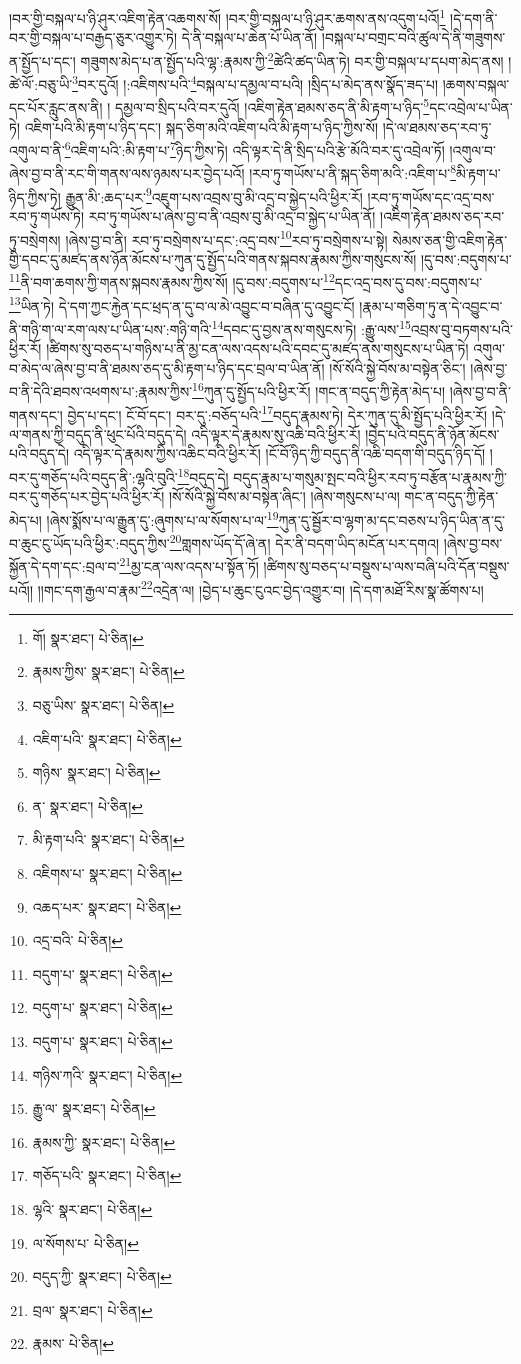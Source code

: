 །བར་གྱི་བསྐལ་པ་ཉི་ཤུར་འཇིག་རྟེན་འཆགས་སོ། །བར་གྱི་བསྐལ་པ་ཉི་ཤུར་ཆགས་ནས་འདུག་པའོ།\footnote{གོ།  སྣར་ཐང་།  པེ་ཅིན། } །དེ་དག་ནི་བར་གྱི་བསྐལ་པ་བརྒྱད་ཅུར་འགྱུར་ཏེ། དེ་ནི་བསྐལ་པ་ཆེན་པོ་ཡིན་ནོ། །བསྐལ་པ་བགྲང་བའི་ཚུལ་དེ་ནི་གཟུགས་ན་སྤྱོད་པ་དང་། གཟུགས་མེད་པ་ན་སྤྱོད་པའི་ལྷ་:རྣམས་ཀྱི་\footnote{རྣམས་ཀྱིས་  སྣར་ཐང་།  པེ་ཅིན། }ཚེའི་ཚད་ཡིན་ཏེ། བར་གྱི་བསྐལ་པ་དཔག་མེད་ནས། །ཚེ་ལོ་:བཅུ་ཡི་\footnote{བཅུ་ཡིས་  སྣར་ཐང་།  པེ་ཅིན། }བར་དུའོ། །:འཇིགས་པའི་\footnote{འཇིག་པའི་  སྣར་ཐང་།  པེ་ཅིན། }བསྐལ་པ་དམྱལ་བ་པའི། །སྲིད་པ་མེད་ནས་སྣོད་ཟད་པ། །ཆགས་བསྐལ་དང་པོར་རླུང་ནས་ནི། །
དམྱལ་བ་སྲིད་པའི་བར་དུའོ། །འཇིག་རྟེན་ཐམས་ཅད་ནི་མི་རྟག་པ་ཉིད་\footnote{གཉིས་  སྣར་ཐང་།  པེ་ཅིན། }དང་འབྲེལ་པ་ཡིན་ཏེ། འཇིག་པའི་མི་རྟག་པ་ཉིད་དང་། སྐད་ཅིག་མའི་འཇིག་པའི་མི་རྟག་པ་ཉིད་ཀྱིས་སོ། །དེ་ལ་ཐམས་ཅད་རབ་ཏུ་འགུལ་བ་ནི་\footnote{ན་  སྣར་ཐང་།  པེ་ཅིན། }འཇིག་པའི་:མི་རྟག་པ་\footnote{མི་རྟག་པའི་  སྣར་ཐང་།  པེ་ཅིན། }ཉིད་ཀྱིས་ཏེ། འདི་ལྟར་དེ་ནི་སྲིད་པའི་རྩེ་མོའི་བར་དུ་འབྲེལ་ཏོ། །འགུལ་བ་ཞེས་བྱ་བ་ནི་རང་གི་གནས་ལས་ཉམས་པར་བྱེད་པའོ། །རབ་ཏུ་གཡོས་པ་ནི་སྐད་ཅིག་མའི་:འཇིག་པ་\footnote{འཇིགས་པ་  སྣར་ཐང་།  པེ་ཅིན། }མི་རྟག་པ་ཉིད་ཀྱིས་ཏེ། རྒྱུན་མི་:ཆད་པར་\footnote{འཆད་པར་  སྣར་ཐང་།  པེ་ཅིན། }འཇུག་པས་འབྲས་བུ་མི་འདྲ་བ་སྐྱེད་པའི་ཕྱིར་རོ། །རབ་ཏུ་གཡོས་དང་འདྲ་བས་རབ་ཏུ་གཡོས་ཏེ། རབ་ཏུ་གཡོས་པ་ཞེས་བྱ་བ་ནི་འབྲས་བུ་མི་འདྲ་བ་སྐྱེད་པ་ཡིན་ནོ། །འཇིག་རྟེན་ཐམས་ཅད་རབ་ཏུ་བསྲེགས། །ཞེས་བྱ་བ་ནི། རབ་ཏུ་བསྲེགས་པ་དང་:འདྲ་བས་\footnote{འདྲ་བའི་  པེ་ཅིན། }རབ་ཏུ་བསྲེགས་པ་སྟེ། སེམས་ཅན་གྱི་འཇིག་རྟེན་གྱི་དབང་དུ་མཛད་ནས་ཉོན་མོངས་པ་ཀུན་དུ་སྤྱོད་པའི་གནས་སྐབས་རྣམས་ཀྱིས་གསུངས་སོ། །དུ་བས་:བདུགས་པ་\footnote{བདུག་པ་  སྣར་ཐང་།  པེ་ཅིན། }ནི་བག་ཆགས་ཀྱི་གནས་སྐབས་རྣམས་ཀྱིས་སོ། །དུ་བས་:བདུགས་པ་\footnote{བདུག་པ་  སྣར་ཐང་།  པེ་ཅིན། }དང་འདྲ་བས་དུ་བས་:བདུགས་པ་\footnote{བདུག་པ་  སྣར་ཐང་།  པེ་ཅིན། }ཡིན་ཏེ། དེ་དག་ཀྱང་རྐྱེན་དང་ཕྲད་ན་དུ་བ་ལ་མེ་འབྱུང་བ་བཞིན་དུ་འབྱུང་ངོ། །རྣམ་པ་གཅིག་ཏུ་ན་དེ་འབྱུང་བ་ནི་གཉི་ག་ལ་རག་ལས་པ་ཡིན་པས་:གཉི་གའི་\footnote{གཉིས་ཀའི་  སྣར་ཐང་།  པེ་ཅིན། }དབང་དུ་བྱས་ནས་གསུངས་ཏེ། :རྒྱུ་ལས་\footnote{རྒྱུ་ལ་  སྣར་ཐང་།  པེ་ཅིན། }འབྲས་བུ་བཏགས་པའི་ཕྱིར་རོ། །ཚིགས་སུ་བཅད་པ་གཉིས་པ་ནི་མྱ་ངན་ལས་འདས་པའི་དབང་དུ་མཛད་ནས་གསུངས་པ་ཡིན་ཏེ། འགུལ་བ་མེད་ལ་ཞེས་བྱ་བ་ནི་ཐམས་ཅད་དུ་མི་རྟག་པ་ཉིད་དང་བྲལ་བ་ཡིན་ནོ། །སོ་སོའི་སྐྱེ་བོས་མ་བསྟེན་ཅིང་། །ཞེས་བྱ་བ་ནི་དེའི་ཐབས་འཕགས་པ་:རྣམས་ཀྱིས་\footnote{རྣམས་ཀྱི་  སྣར་ཐང་།  པེ་ཅིན། }ཀུན་དུ་སྤྱོད་པའི་ཕྱིར་རོ། །གང་ན་བདུད་ཀྱི་རྟེན་མེད་པ། །ཞེས་བྱ་བ་ནི་གནས་དང་། བྱེད་པ་དང་། ངོ་བོ་དང་། བར་དུ་:བཅོད་པའི་\footnote{གཅོད་པའི་  སྣར་ཐང་།  པེ་ཅིན། }བདུད་རྣམས་ཏེ། དེར་ཀུན་དུ་མི་སྤྱོད་པའི་ཕྱིར་རོ། །དེ་ལ་གནས་ཀྱི་བདུད་ནི་ཕུང་པོའི་བདུད་དེ། འདི་ལྟར་དེ་རྣམས་སུ་འཆི་བའི་ཕྱིར་རོ། །བྱེད་པའི་བདུད་ནི་ཉོན་མོངས་པའི་བདུད་དེ། འདི་ལྟར་དེ་རྣམས་ཀྱིས་འཆིང་བའི་ཕྱིར་རོ། །ངོ་བོ་ཉིད་ཀྱི་བདུད་ནི་འཆི་བདག་གི་བདུད་ཉིད་དོ། །བར་དུ་གཅོད་པའི་བདུད་ནི་:ལྷའི་བུའི་\footnote{ལྷའི་  སྣར་ཐང་།  པེ་ཅིན། }བདུད་དེ། བདུད་རྣམ་པ་གསུམ་སྤང་བའི་ཕྱིར་རབ་ཏུ་བརྩོན་པ་རྣམས་ཀྱི་བར་དུ་གཅོད་པར་བྱེད་པའི་ཕྱིར་རོ། །སོ་སོའི་སྐྱེ་བོས་མ་བསྟེན་ཞིང་། །ཞེས་གསུངས་པ་ལ། གང་ན་བདུད་ཀྱི་རྟེན་མེད་པ། །ཞེས་སྨོས་པ་ལ་རྒྱུན་དུ་:ཞུགས་པ་ལ་སོགས་པ་ལ་\footnote{ལ་སོགས་པ་  པེ་ཅིན། }ཀུན་དུ་སྦྱོར་བ་ལྷག་མ་དང་བཅས་པ་ཉིད་ཡིན་ན་དུ་བ་ཆུང་ངུ་ཡོད་པའི་ཕྱིར་:བདུད་ཀྱིས་\footnote{བདུད་ཀྱི་  སྣར་ཐང་།  པེ་ཅིན། }གླགས་ཡོད་དོ་ཞེ་ན། དེར་ནི་བདག་ཡིད་མངོན་པར་དགའ། །ཞེས་བྱ་བས་སྐྱོན་དེ་དག་དང་:བྲལ་བ་\footnote{བྲལ་  སྣར་ཐང་།  པེ་ཅིན། }མྱ་ངན་ལས་འདས་པ་སྟོན་ཏོ། །ཚིགས་སུ་བཅད་པ་བསྡུས་པ་ལས་བཞི་པའི་དོན་བསྡུས་པའོ།། །།གང་དག་རྒྱལ་བ་རྣམ་\footnote{རྣམས་  པེ་ཅིན། }འདྲེན་ལ། །བྱེད་པ་ཆུང་ངུའང་བྱེད་འགྱུར་བ། །དེ་དག་མཐོ་རིས་སྣ་ཚོགས་པ། 